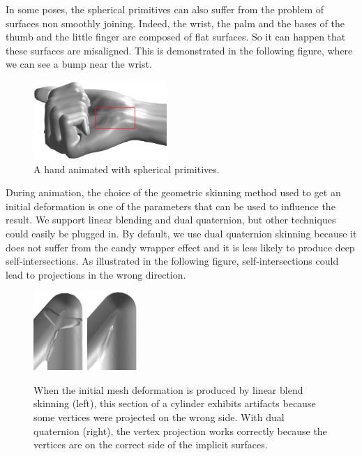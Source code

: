 \documentclass[a4paper,10pt]{article}
\begin{document}
\begin{multicols}{2}
In some poses, the spherical primitives can also suffer from the problem of surfaces non smoothly joining.
Indeed, the wrist, the palm and the bases of the thumb and the little finger are composed of flat surfaces.
So it can happen that these surfaces are misaligned.
This is demonstrated in the following figure, where we can see a bump near the wrist.

\begin{figure}[H]
\centering
\includegraphics[width=0.45\textwidth]{figs/palm_implicit}
\caption{A hand animated with spherical primitives.}
\end{figure}

During animation, the choice of the geometric skinning method used to get an initial deformation is one of the parameters that can be used to influence the result.
We support linear blending and dual quaternion, but other techniques could easily be plugged in.
By default, we use dual quaternion skinning because it does not suffer from the candy wrapper effect and it is less likely to produce deep self-intersections.
As illustrated in the following figure, self-intersections could lead to projections in the wrong direction.

\begin{figure}[H]
\centering
\includegraphics[width=0.17\textwidth]{figs/cylinder_linear_self}
\qquad
\includegraphics[width=0.17\textwidth]{figs/cylinder_dualquat_self}
\caption{When the initial mesh deformation is produced by linear blend skinning (left), this section of a cylinder exhibits artifacts because some vertices were projected on the wrong side.
With dual quaternion (right), the vertex projection works correctly because the vertices are on the correct side of the implicit surfaces.}
\end{figure}


\end{multicols}
\end{document}
